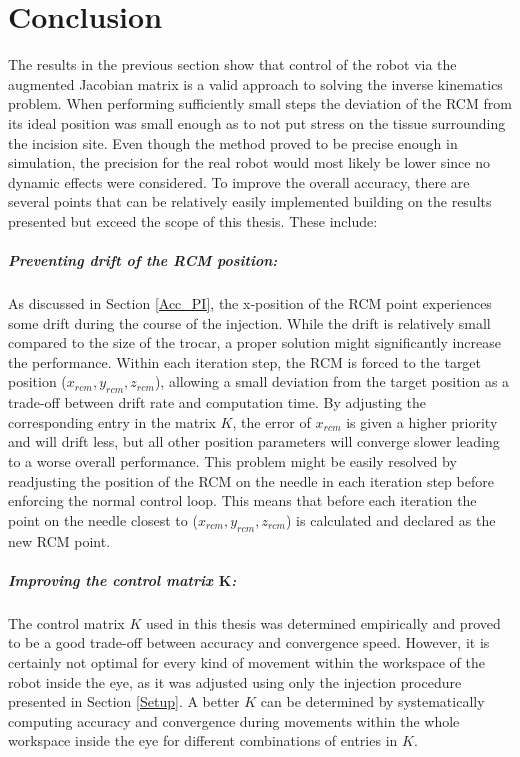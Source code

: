 \chapter{Conclusion}

The results in the previous section show that control of the robot via the augmented Jacobian matrix is a valid approach to solving the inverse kinematics problem. When performing sufficiently small steps the deviation of the RCM from its ideal position was small enough as to not put stress on the tissue surrounding the incision site. Even though the method proved to be precise enough in simulation, the precision for the real robot would most likely be lower since no dynamic effects were considered. To improve the overall accuracy, there are several points that can be relatively easily implemented building on the results presented but exceed the scope of this thesis. These include: 

\paragraph{Preventing drift of the RCM position:} As discussed in Section \ref{Acc_PI}, the x-position of the RCM point experiences some drift during the course of the injection. While the drift is relatively small compared to the size of the trocar, a proper solution might significantly increase the performance. Within each iteration step, the RCM is forced to the target position ($x_{rcm}, y_{rcm}, z_{rcm}$), allowing a small deviation from the target position as a trade-off between drift rate and computation time. By adjusting the corresponding entry in the matrix $K$, the error of $x_{rcm}$ is given a higher priority and will drift less, but all other position parameters will converge slower leading to a worse overall performance. This problem might be easily resolved by readjusting the position of the RCM on the needle in each iteration step before enforcing the normal control loop. This means that before each iteration the point on the needle closest to ($x_{rcm}, y_{rcm}, z_{rcm}$) is calculated and declared as the new RCM point. 

\paragraph{Improving the control matrix $\bm{K}$:} The control matrix $K$ used in this thesis was determined empirically and proved to be a good trade-off between accuracy and convergence speed. However, it is certainly not optimal for every kind of movement within the workspace of the robot inside the eye, as it was adjusted using only the injection procedure presented in Section \ref{Setup}. A better $K$ can be determined by systematically computing accuracy and convergence during movements within the whole workspace inside the eye for different combinations of entries in $K$.

